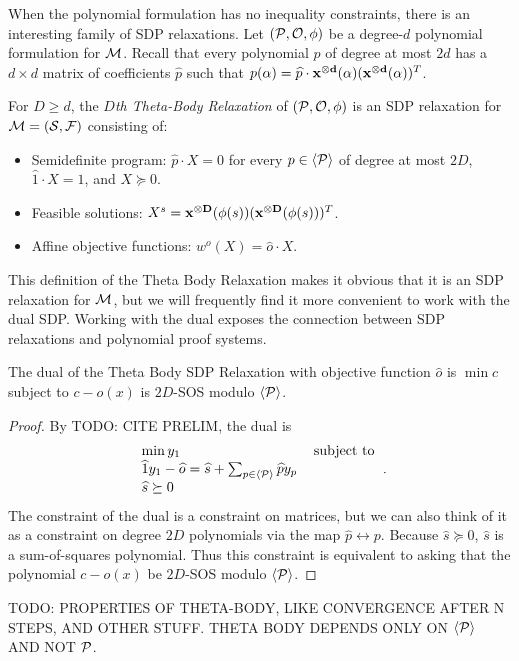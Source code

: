 When the polynomial formulation has no inequality constraints, there is an interesting family of SDP relaxations. Let $(\mathcal P, \mathcal O, \phi)$ be a degree-$d$ polynomial formulation for $\mathcal M$. Recall that every polynomial $p$ of degree at most $2d$ has a $d \times d$ matrix of coefficients $\widehat{p}$ such that $p(\alpha) = \widehat{p} \cdot \mathbf{x^{\otimes d}}(\alpha)(\mathbf{x^{\otimes d}}(\alpha))^T$.
\begin{definition}
For $D \geq d$, the \emph{$D$th Theta-Body Relaxation} of $(\mathcal P,\mathcal O,\phi)$ is an SDP relaxation for $\mathcal M = (\mathcal S, \mathcal F)$ consisting of: 
\begin{itemize}
\item Semidefinite program: $\widehat{p} \cdot X = 0$ for every $p \in \langle \mathcal P \rangle$ of degree at most $2D$, $\widehat{1} \cdot X = 1$, and $X \succeq 0$.
\item Feasible solutions: $X^s = \mathbf{x^{\otimes D}}(\phi(s))(\mathbf{x^{\otimes D}}(\phi(s)))^T$.
\item Affine objective functions: $w^o(X) = \widehat{o} \cdot X$.
\end{itemize}
\end{definition}
This definition of the Theta Body Relaxation makes it obvious that it is an SDP relaxation for $\mathcal M$, but we will frequently find it more convenient to work with the dual SDP. Working with the dual exposes the connection between SDP relaxations and polynomial proof systems.
\begin{lemma}
The dual of the Theta Body SDP Relaxation with objective function $\widehat{o}$ is $\min c$ subject to $c - o(x)$ is $2D$-SOS modulo $\langle \mathcal P \rangle$.
\end{lemma}
\begin{proof}
By TODO: CITE PRELIM, the dual is
\[\begin{tabular}{ll} $\min y_1$ & subject to \\ $\widehat{1}y_1 - \widehat{o} = \widehat{s} + \sum_{p \in \gen{\cP}} \widehat{p}y_p$ \\ $\widehat{s} \succeq 0$\end{tabular}.\]
The constraint of the dual is a constraint on matrices, but we can also think of it as a constraint on degree $2D$ polynomials via the map $\widehat{p} \leftrightarrow p$. Because $\widehat{s} \succeq 0$, $\widehat{s}$ is a sum-of-squares polynomial. Thus this constraint is equivalent to asking that the polynomial $c - o(x)$ be $2D$-SOS modulo $\langle \mathcal P \rangle$.
\end{proof}

TODO: PROPERTIES OF THETA-BODY, LIKE CONVERGENCE AFTER N STEPS, AND OTHER STUFF. THETA BODY DEPENDS ONLY ON $\langle \mathcal P \rangle$ AND NOT $\mathcal P$.

